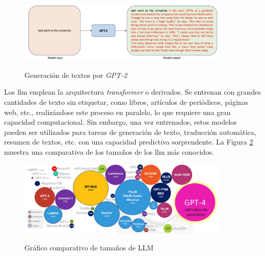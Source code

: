 \begin{figure}[H]
    \caption{Generación de textos por \emph{GPT-2}}
    \centering
    \includegraphics[width=0.9\textwidth]{./figuras/GPT2_text_generation.png}
    \label{fig:gpt2_text_generation}
\end{figure}

Los \gls{llm} emplean la arquitectura \emph{transformer} o derivados. Se entrenan con grandes cantidades de texto sin etiquetar, como libros, artículos de periódicos, páginas web, etc., realizándose este proceso en paralelo, lo que requiere una gran capacidad computacional. Sin embargo, una vez entrenados, estos modelos pueden ser utilizados para tareas de generación de texto, traducción automática, resumen de textos, etc. con una capacidad predictiva sorprendente. La Figura \ref{fig:llm_sizes} muestra una comparativa de los tamaños de los \gls{llm} más conocidos.

\begin{figure}[H]
    \caption{Gráfico comparativo de tamaños de LLM}
    \centering
    \includegraphics[width=0.9\textwidth]{./figuras/LLMs_sizes.png}
    \label{fig:llm_sizes}
\end{figure}

